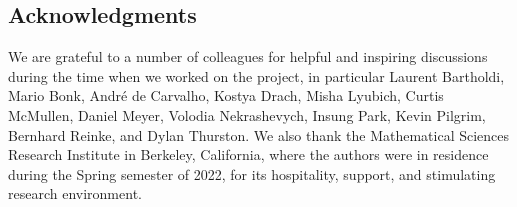 \documentclass{amsart}
\theoremstyle{plain}
\newtheorem{theorem}{Theorem}[section]
\newtheorem{lemma}[theorem]{Lemma}
\theoremstyle{definition}
\theoremstyle{remark}
\newcommand{\lineclear}
    {\rule{0pt}{0pt}\nopagebreak\par\nopagebreak\noindent}
\newcommand{\CC}{{\mathcal C}}
\newcommand{\DF}{{\mathfrak D}}
\begin{document}
\subsection{Acknowledgments}
We are grateful to a number of colleagues for helpful and inspiring discussions during the time when we worked on the 
project, in particular Laurent Bartholdi, Mario Bonk, Andr\'{e} de Carvalho, Kostya Drach, Misha Lyubich, Curtis McMullen, 
Daniel Meyer, Volodia Nekrashevych, Insung Park, Kevin Pilgrim, Bernhard Reinke, and Dylan Thurston.
We also thank the Mathematical Sciences Research Institute in Berkeley, California, where the authors were in residence 
during the Spring semester of 2022, for its hospitality, support, and stimulating research environment.

%
%
%
%
%
%
%
%
%
%
%
\end{document}
